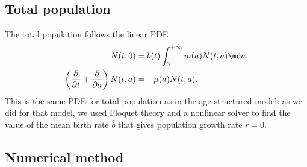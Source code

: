 \documentclass{jpmarticle}
\begin{document}
\subsection{Total population}

The total population follows the linear PDE
\begin{equation}
  \begin{split}
    N(t, 0) &=
    b(t) \int_0^{+\infty} m(a) N(t, a) \md a,
    \\
    \left(\frac{\partial}{\partial t}
      + \frac{\partial}{\partial a}\right)
    N(t, a) &=
    - \mu(a) N(t, a).
  \end{split}
\end{equation}
This is the same PDE for total population as in the age-structured
model: as we did for that model, we used Floquet theory and a
nonlinear solver to find the value of the mean birth rate $\bar{b}$
that gives population growth rate $r = 0$.


\subsection{Numerical method}


\printbibliography
\end{document}
